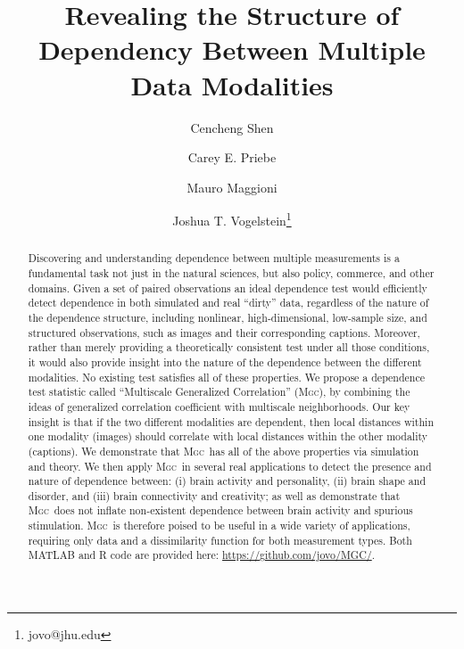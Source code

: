 \documentclass[11pt]{article}
\providecommand{\sct}[1]{{\normalfont\textsc{#1}}}
\newcommand{\Mgc}{\sct{Mgc}}
\newcommand{\website}{\url{https://github.com/jovo/MGC/}}
\begin{document}
\def\spacingset#1{\renewcommand{\baselinestretch}%
{#1}\small\normalsize} \spacingset{1}

\title{\bf Revealing the Structure of Dependency Between Multiple Data Modalities}
\author[1,2]{Cencheng Shen} %
\author[2,3]{Carey E. Priebe}%
\author[4]{Mauro Maggioni}%
\author[2,5]{Joshua T. Vogelstein\thanks{jovo@jhu.edu}}
\maketitle
\pagestyle{empty}

\begin{abstract}
Discovering and understanding dependence between multiple  measurements is a fundamental task not just in the natural sciences, but also policy, commerce, and other domains.
Given a set of paired observations an ideal dependence test would efficiently detect dependence in both simulated and real ``dirty'' data, regardless of the nature of the dependence structure, including nonlinear,  high-dimensional, low-sample size, and structured observations, such as images and their corresponding captions.  Moreover, rather than merely providing a theoretically consistent test under all those conditions, it would also provide insight into the nature of the dependence between the different modalities.  
No existing test satisfies all of these properties.
We propose a  dependence test statistic called ``Multiscale Generalized Correlation'' (\Mgc), by combining the ideas of generalized correlation coefficient with multiscale neighborhoods.
Our key insight is that if the two different modalities are dependent, then local distances within one modality (images) should correlate with local distances within the other modality (captions).  
We demonstrate that \Mgc~has all of the above properties via simulation and theory.
We then apply \Mgc~in several real applications to detect the presence and nature  of dependence between: (i)  brain activity and personality, (ii) brain shape and disorder, and (iii) brain connectivity and creativity; as well as demonstrate that \Mgc~does not inflate non-existent dependence between brain activity and spurious stimulation.  
\Mgc~is therefore poised to be useful in a wide variety of applications, requiring only data and a dissimilarity function for both measurement types.  Both MATLAB and R code are provided here: \website.
\end{abstract}
\end{document}
